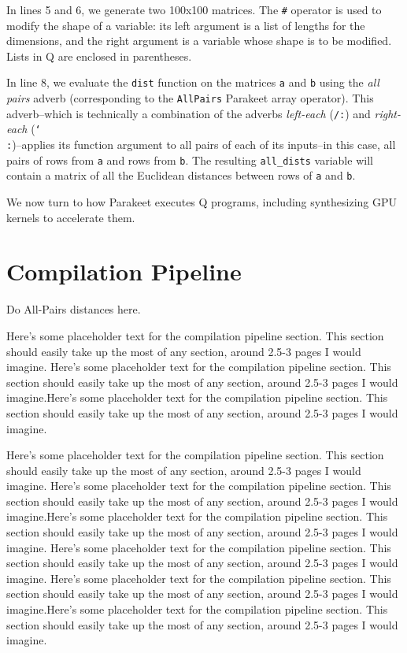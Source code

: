 \documentclass[preprint]{sigplanconf}
\begin{document}
In lines 5 and 6, we generate two 100x100 matrices.  The \texttt{\#} operator is
used to modify the shape of a variable: its left argument is a list of lengths
for the dimensions, and the right argument is a variable whose shape is to be
modified.  Lists in Q are enclosed in parentheses.

In line 8, we evaluate the \texttt{dist} function on the matrices \texttt{a} and
\texttt{b} using the {\it all pairs} adverb (corresponding to the
\texttt{AllPairs} Parakeet array operator).  This adverb--which is technically
a combination of the adverbs \emph{left-each} (\texttt{/:}) and
\emph{right-each} (\texttt{\char`\\:})--applies its function argument to all
pairs of each of its inputs--in this case, all pairs of rows from \texttt{a} and
rows from \texttt{b}.  The resulting \texttt{all\_dists} variable will contain a
matrix of all the Euclidean distances between rows of \texttt{a} and \texttt{b}.

We now turn to how Parakeet executes Q programs, including synthesizing GPU
kernels to accelerate them.

\section{Compilation Pipeline}
\label{Compilation}

Do All-Pairs distances here.

Here's some placeholder text for the compilation pipeline section.  This
section should easily take up the most of any section, around 2.5-3 pages I
would imagine.
Here's some placeholder text for the compilation pipeline section.  This
section should easily take up the most of any section, around 2.5-3 pages I
would imagine.Here's some placeholder text for the compilation pipeline section.
 This
section should easily take up the most of any section, around 2.5-3 pages I
would imagine.

Here's some placeholder text for the compilation pipeline section.  This
section should easily take up the most of any section, around 2.5-3 pages I
would imagine.
Here's some placeholder text for the compilation pipeline section.  This
section should easily take up the most of any section, around 2.5-3 pages I
would imagine.Here's some placeholder text for the compilation pipeline section.
 This
section should easily take up the most of any section, around 2.5-3 pages I
would imagine.
Here's some placeholder text for the compilation pipeline section.  This
section should easily take up the most of any section, around 2.5-3 pages I
would imagine.
Here's some placeholder text for the compilation pipeline section.  This
section should easily take up the most of any section, around 2.5-3 pages I
would imagine.Here's some placeholder text for the compilation pipeline section.
 This
section should easily take up the most of any section, around 2.5-3 pages I
would imagine.
\end{document}
